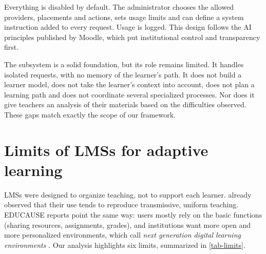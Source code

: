 Everything is disabled by default. The administrator chooses the allowed
providers, placements and actions, sets usage limits and can define a
system instruction added to every request. Usage is logged. This design
follows the AI principles published by Moodle, which put institutional
control and transparency first.

The subsystem is a solid foundation, but its role remains limited. It
handles isolated requests, with no memory of the learner's path. It does
not build a learner model, does not take the learner's context into
account, does not plan a learning path and does not coordinate several
specialized processes. Nor does it give teachers an analysis of their
materials based on the difficulties observed. These gaps match exactly the
scope of our framework.

\section{Limits of LMSs for adaptive learning}
\label{sec-limits}

LMSs were designed to organize teaching, not to support each learner.
\citet{coates2005} already observed that their use tends to reproduce
transmissive, uniform teaching. EDUCAUSE reports point the same way: users
mostly rely on the basic functions (sharing resources, assignments,
grades), and institutions want more open and more personalized
environments, which \citet{brown2015} call \emph{next generation digital
learning environments} \cite{dahlstrom2014,brown2015}. Our analysis
highlights six limits, summarized in \cref{tab-limits}.

